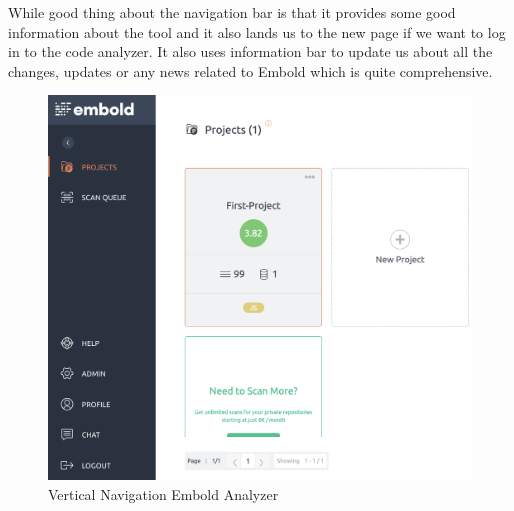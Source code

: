 While good thing about the navigation bar is that it provides some good information about the tool and it also lands us to the new page if we want to log in to the code analyzer. It also uses information bar to update us about all the changes, updates or any news related to Embold which is quite comprehensive.
\begin{figure}[htbp]
\begin{center}
\includegraphics[width=6.5 in, height=3 in]{vertical.png}
\caption{Vertical Navigation Embold Analyzer ~\cite{emboldio}} 
\label{fig:vertical}
\end{center}
\end{figure}

